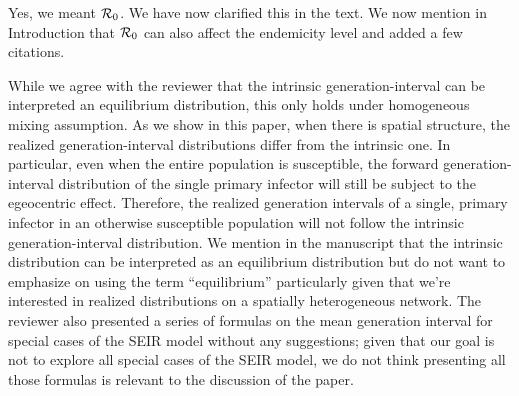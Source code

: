 

Yes, we meant ${\cal R}_{0}$. We have now clarified this in the text.
We now mention in Introduction that ${\cal R}_{0}$ can also affect the endemicity level and added a few citations.


While we agree with the reviewer that the intrinsic generation-interval can be interpreted an equilibrium distribution, this only holds under homogeneous mixing assumption. 
As we show in this paper, when there is spatial structure, the realized generation-interval distributions differ from the intrinsic one. 
In particular, even when the entire population is susceptible, the forward generation-interval distribution of the single primary infector will still be subject to the egeocentric effect.
Therefore, the realized generation intervals of a single, primary infector in an otherwise susceptible population will not follow the intrinsic generation-interval distribution. We mention in the manuscript that the intrinsic distribution can be interpreted as an equilibrium distribution but do not want to emphasize on using the term ``equilibrium'' particularly given that we're interested in realized distributions on a spatially heterogeneous network.
The reviewer also presented a series of formulas on the mean generation interval for special cases of the SEIR model without any suggestions;
given that our goal is not to explore all special cases of the SEIR model, we do not think presenting all those formulas is relevant to the discussion of the paper.


